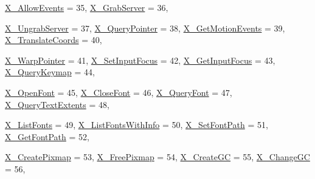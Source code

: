 \begin{DoxyCompactItemize}
\hyperlink{namespace_tao_1_1_platform_1_1_x11_a2cfd0ff14439adb84809be96fb4c7d4b}{X\_\-AllowEvents} =  35, 
\hyperlink{namespace_tao_1_1_platform_1_1_x11_a2cfd0ff14439adb84809be96fb4c7d4b}{X\_\-GrabServer} =  36, 
\par
\hyperlink{namespace_tao_1_1_platform_1_1_x11_a2cfd0ff14439adb84809be96fb4c7d4b}{X\_\-UngrabServer} =  37, 
\hyperlink{namespace_tao_1_1_platform_1_1_x11_a2cfd0ff14439adb84809be96fb4c7d4b}{X\_\-QueryPointer} =  38, 
\hyperlink{namespace_tao_1_1_platform_1_1_x11_a2cfd0ff14439adb84809be96fb4c7d4b}{X\_\-GetMotionEvents} =  39, 
\hyperlink{namespace_tao_1_1_platform_1_1_x11_a2cfd0ff14439adb84809be96fb4c7d4b}{X\_\-TranslateCoords} =  40, 
\par
\hyperlink{namespace_tao_1_1_platform_1_1_x11_a2cfd0ff14439adb84809be96fb4c7d4b}{X\_\-WarpPointer} =  41, 
\hyperlink{namespace_tao_1_1_platform_1_1_x11_a2cfd0ff14439adb84809be96fb4c7d4b}{X\_\-SetInputFocus} =  42, 
\hyperlink{namespace_tao_1_1_platform_1_1_x11_a2cfd0ff14439adb84809be96fb4c7d4b}{X\_\-GetInputFocus} =  43, 
\hyperlink{namespace_tao_1_1_platform_1_1_x11_a2cfd0ff14439adb84809be96fb4c7d4b}{X\_\-QueryKeymap} =  44, 
\par
\hyperlink{namespace_tao_1_1_platform_1_1_x11_a2cfd0ff14439adb84809be96fb4c7d4b}{X\_\-OpenFont} =  45, 
\hyperlink{namespace_tao_1_1_platform_1_1_x11_a2cfd0ff14439adb84809be96fb4c7d4b}{X\_\-CloseFont} =  46, 
\hyperlink{namespace_tao_1_1_platform_1_1_x11_a2cfd0ff14439adb84809be96fb4c7d4b}{X\_\-QueryFont} =  47, 
\hyperlink{namespace_tao_1_1_platform_1_1_x11_a2cfd0ff14439adb84809be96fb4c7d4b}{X\_\-QueryTextExtents} =  48, 
\par
\hyperlink{namespace_tao_1_1_platform_1_1_x11_a2cfd0ff14439adb84809be96fb4c7d4b}{X\_\-ListFonts} =  49, 
\hyperlink{namespace_tao_1_1_platform_1_1_x11_a2cfd0ff14439adb84809be96fb4c7d4b}{X\_\-ListFontsWithInfo} =  50, 
\hyperlink{namespace_tao_1_1_platform_1_1_x11_a2cfd0ff14439adb84809be96fb4c7d4b}{X\_\-SetFontPath} =  51, 
\hyperlink{namespace_tao_1_1_platform_1_1_x11_a2cfd0ff14439adb84809be96fb4c7d4b}{X\_\-GetFontPath} =  52, 
\par
\hyperlink{namespace_tao_1_1_platform_1_1_x11_a2cfd0ff14439adb84809be96fb4c7d4b}{X\_\-CreatePixmap} =  53, 
\hyperlink{namespace_tao_1_1_platform_1_1_x11_a2cfd0ff14439adb84809be96fb4c7d4b}{X\_\-FreePixmap} =  54, 
\hyperlink{namespace_tao_1_1_platform_1_1_x11_a2cfd0ff14439adb84809be96fb4c7d4b}{X\_\-CreateGC} =  55, 
\hyperlink{namespace_tao_1_1_platform_1_1_x11_a2cfd0ff14439adb84809be96fb4c7d4b}{X\_\-ChangeGC} =  56, 
\par

\end{DoxyCompactItemize}
